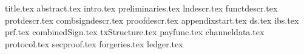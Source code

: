 \documentclass{llncs}
\begin{document}
\pagestyle{plain}
{title.tex}
{abstract.tex}
{intro.tex}
{preliminaries.tex}
{lndescr.tex}
{functdescr.tex}
{protdescr.tex}
{combsigndescr.tex}
{proofdescr.tex}
{appendixstart.tex}
{ds.tex}
{ibs.tex}
{prf.tex}
{combinedSign.tex}
{txStructure.tex}
{payfunc.tex}
{channeldata.tex}
{protocol.tex}
{secproof.tex}
{forgeries.tex}
{ledger.tex}


\end{document}
